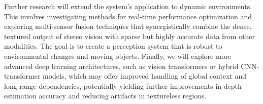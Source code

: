 \documentclass[conference]{IEEEtran}
\begin{document}
Further research will extend the system's application to dynamic environments. This involves investigating methods for real-time performance optimization and exploring multi-sensor fusion techniques that synergistically combine the dense, textured output of stereo vision with sparse but highly accurate data from other modalities. The goal is to create a perception system that is robust to environmental changes and moving objects. Finally, we will explore more advanced deep learning architectures, such as vision transformers or hybrid CNN-transformer models, which may offer improved handling of global context and long-range dependencies, potentially yielding further improvements in depth estimation accuracy and reducing artifacts in textureless regions.

%  
% 

 

\end{document}
